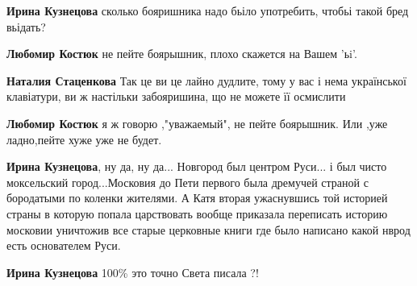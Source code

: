 \begin{itemize}
\begin{itemize}
\textbf{Ирина Кузнецова} сколько бояришника надо бьіло употребить, чтобьі такой бред вьідать?

 
\textbf{Любомир Костюк} не пейте боярышник, плохо скажется на Вашем 'ьi'.

 
\textbf{Наталия Стаценкова} Так це ви це лайно дудлите, тому у вас і нема української клавіатури, ви ж настільки забояришина, що не можете її осмислити

 
\textbf{Любомир Костюк} я ж говорю ,"уважаемый", не пейте боярышник. Или ,уже ладно,пейте хуже уже не будет.

 
\textbf{Ирина Кузнецова}, ну да, ну да... Новгород был центром Руси... і был чисто моксельский город...Московия до Пети первого была дремучей страной с бородатыми по коленки жителями. А Катя вторая ужаснувшись той историей страны в которую попала царствовать вообще приказала переписать историю московии уничтожив все старые церковные книги где было написано какой нврод есть основателем Руси.

 
\textbf{Ирина Кузнецова} 100\% это точно Света писала ?!

 

\end{itemize}
\end{itemize}

